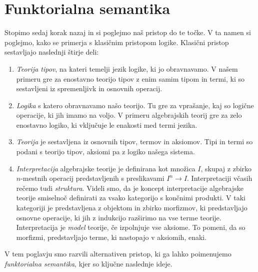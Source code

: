 \documentclass[../kategoricna_logika.tex]{subfiles}
\begin{document}
\section{Funktorialna semantika}
\label{sec:funkt-semant}
%
Stopimo sedaj korak nazaj in si poglejmo naš pristop do te točke.
V ta namen si poglejmo, kako se primerja s klasičnim pristopom logike.
Klasični pristop sestavljajo naslednji štirje deli:
\begin{enumerate}
\item \emph{Teorija tipov}, na kateri temelji jezik logike, ki jo obravnavamo.
  V našem primeru gre za enostavno teorijo tipov z enim samim tipom in termi,
  ki so sestavljeni iz spremenljivk in osnovnih operacij.
\item \emph{Logika} s katero obravnavamo našo teorijo. Tu gre za vprašanje,
  kaj so logične operacije, ki jih imamo na voljo. V primeru algebrajskih teorij
  gre za zelo enostavno logiko, ki vključuje le enakosti med termi jezika.
\item \emph{Teorija} je sestavljena iz osnovnih tipov, termov in aksiomov.
  Tipi in termi so podani s teorijo tipov, aksiomi pa z logiko našega sistema.
\item \emph{Interpretacija} algebrajske teorije je definirana kot množica $I$,
  skupaj z zbirko $n$-mestnih operacij predstavljenih s preslikavami $I^n \to I$.
  Interpretaciji včasih rečemo tudi \emph{struktura}. Videli smo, da je
  koncept interpretacije algebrajske teorije smiselnoč definirati za vsako
  kategorijo s končnimi produkti. V taki kategoriji je predstavljena z
  objektom in zbirko morfizmov, ki predstavljajo osnovne operacije, ki jih
  z indukcijo razširimo na vse terme teorije. Interpretacija je \emph{model}
  teorije, če izpolnjuje vse aksiome. To pomeni, da so
  morfizmi, predstavljajo terme, ki nastopajo v aksiomih, enaki.  
\end{enumerate}
V tem poglavju smo razvili alternativen pristop, ki ga lahko poimenujemo
\emph{funktorialna semantika}, kjer so ključne naslednje ideje.
\end{document}
